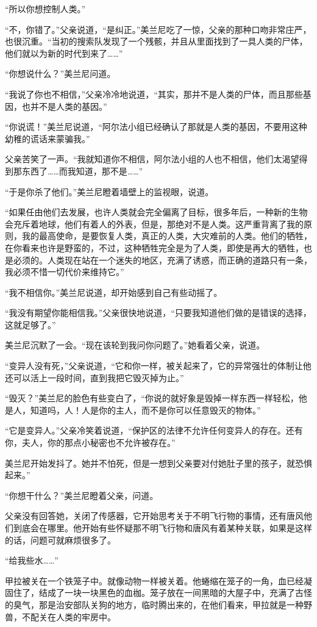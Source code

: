 “所以你想控制人类。”

“不，你错了。”父亲说道，“是纠正。”美兰尼吃了一惊，父亲的那种口吻非常庄严，也很沉重。“当初的搜索队发现了一个残骸，并且从里面找到了一具人类的尸体，他们就以为新的时代到来了……”

“你想说什么？”美兰尼问道。

“我说了你也不相信，”父亲冷冷地说道，“其实，那并不是人类的尸体，而且那些基因，也并不是人类的基因。”

“你说谎！”美兰尼说道，“阿尔法小组已经确认了那就是人类的基因，不要用这种幼稚的谎话来蒙骗我。”

父亲苦笑了一声。“我就知道你不相信，阿尔法小组的人也不相信，他们太渴望得到那东西了……而我知道，那不是……”

“于是你杀了他们。”美兰尼瞪着墙壁上的监视眼，说道。

“如果任由他们去发展，也许人类就会完全偏离了目标，很多年后，一种新的生物会充斥着地球，他们有着人的外表，但是，那绝对不是人类。这严重背离了我的原则，我的最高使命，是要恢复人类，真正的人类，大灾难前的人类。他们的牺牲，在你看来也许是野蛮的，不过，这种牺牲完全是为了人类，即使是再大的牺牲，也是必须的。人类现在站在一个迷失的地区，充满了诱惑，而正确的道路只有一条，我必须不惜一切代价来维持它。”

“我不相信你。”美兰尼说道，却开始感到自己有些动摇了。

“我没有期望你能相信我。”父亲很快地说道，“只要我知道他们做的是错误的选择，这就足够了。”

美兰尼沉默了一会。“现在该轮到我问你问题了。”她看着父亲，说道。

“变异人没有死，”父亲说道，“它和你一样，被关起来了，它的异常强壮的体制让他还可以活上一段时间，直到我把它毁灭掉为止。”

“毁灭？”美兰尼的脸色有些变白了，“你说的就好象是毁掉一样东西一样轻松，他是人，知道吗，人！人是你的主人，而不是你可以任意毁灭的物体。”

“它是变异人。”父亲冷笑着说道，“保护区的法律不允许任何变异人的存在。还有你，夫人，你的那点小秘密也不允许被存在。”

美兰尼开始发抖了。她并不怕死，但是一想到父亲要对付她肚子里的孩子，就恐惧起来。”

“你想干什么？”美兰尼瞪着父亲，问道。

父亲没有回答她，关闭了传感器，它开始思考关于不明飞行物的事情，还有唐风他们到底会在哪里。他开始有些怀疑那不明飞行物和唐风有着某种关联，如果是这样的话，问题可就麻烦很多了。

“给我些水……”

甲拉被关在一个铁笼子中。就像动物一样被关着。他蜷缩在笼子的一角，血已经凝固住了，结成了一块一块黑色的血枷。笼子放在一间黑暗的大屋子中，充满了古怪的臭气，那是治安部队关狗的地方，临时腾出来的，在他们看来，甲拉就是一种野兽，不配关在人类的牢房中。

